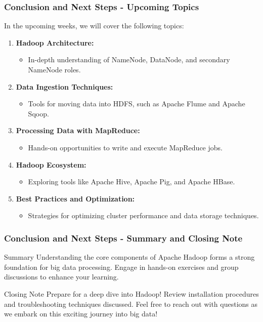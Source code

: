 \documentclass{beamer}
\begin{document}
\begin{frame}[fragile]
    \frametitle{Conclusion and Next Steps - Upcoming Topics}
    In the upcoming weeks, we will cover the following topics:
    
    \begin{enumerate}
        \item \textbf{Hadoop Architecture:}
        \begin{itemize}
            \item In-depth understanding of NameNode, DataNode, and secondary NameNode roles.
        \end{itemize}
        
        \item \textbf{Data Ingestion Techniques:}
        \begin{itemize}
            \item Tools for moving data into HDFS, such as Apache Flume and Apache Sqoop.
        \end{itemize}
        
        \item \textbf{Processing Data with MapReduce:}
        \begin{itemize}
            \item Hands-on opportunities to write and execute MapReduce jobs.
        \end{itemize}
        
        \item \textbf{Hadoop Ecosystem:}
        \begin{itemize}
            \item Exploring tools like Apache Hive, Apache Pig, and Apache HBase.
        \end{itemize}
        
        \item \textbf{Best Practices and Optimization:}
        \begin{itemize}
            \item Strategies for optimizing cluster performance and data storage techniques.
        \end{itemize}
    \end{enumerate}
\end{frame}

\begin{frame}[fragile]
    \frametitle{Conclusion and Next Steps - Summary and Closing Note}
    \begin{block}{Summary}
        Understanding the core components of Apache Hadoop forms a strong foundation for big data processing. 
        Engage in hands-on exercises and group discussions to enhance your learning.
    \end{block}

    \begin{block}{Closing Note}
        Prepare for a deep dive into Hadoop! Review installation procedures and troubleshooting techniques discussed. 
        Feel free to reach out with questions as we embark on this exciting journey into big data!
    \end{block}
\end{frame}
\end{document}

